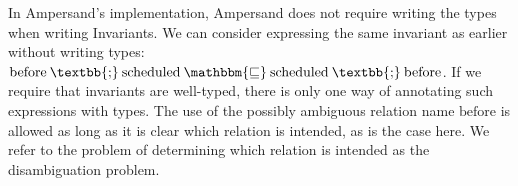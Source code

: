 \documentclass[12pt]{article}
\newcommand{\typesemi}{\mathbin{\text{\textbb{;}}}}
\newcommand{\typesubset}{\mathbin{\mathbbm{\sqsubseteq}}}
\begin{document}
In Ampersand's implementation, Ampersand does not require writing the types when writing Invariants.
We can consider expressing the same invariant as earlier without writing types: $\mathrm{before}\typesemi \mathrm{scheduled} \typesubset \mathrm{scheduled}\typesemi \mathrm{before}$.
If we require that invariants are well-typed, there is only one way of annotating such expressions with types.
The use of the possibly ambiguous relation name $\mathrm{before}$ is allowed as long as it is clear which relation is intended, as is the case here.
We refer to the problem of determining which relation is intended as the disambiguation problem.%
%
%
%
\end{document}
